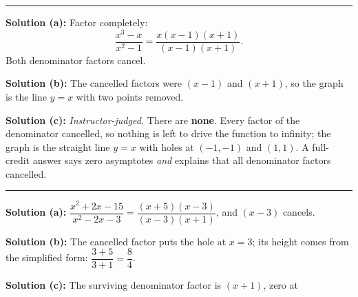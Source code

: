 \documentclass[12pt]{article}
\begin{document}
\vspace{0.25cm}\noindent\rule{\linewidth}{0.2pt}\vspace{0.25cm}


\textbf{Solution (a):} Factor completely:
\[ \frac{x^3-x}{x^2-1} = \frac{x(x-1)(x+1)}{(x-1)(x+1)} . \]
Both denominator factors cancel. 

\textbf{Solution (b):} The cancelled factors were $(x-1)$ and $(x+1)$, so the
graph is the line $y = x$ with two points removed.

\textbf{Solution (c):} \emph{Instructor-judged.} There are \textbf{none}. Every
factor of the denominator cancelled, so nothing is left to drive the function to
infinity; the graph is the straight line $y = x$ with holes at $(-1,-1)$ and
$(1,1)$. A full-credit answer says zero asymptotes \emph{and} explains that all
denominator factors cancelled.

\vspace{0.25cm}\noindent\rule{\linewidth}{0.2pt}\vspace{0.25cm}


\textbf{Solution (a):} $\dfrac{x^2+2x-15}{x^2-2x-3} = \dfrac{(x+5)(x-3)}{(x-3)(x+1)}$,
and $(x-3)$ cancels. 

\textbf{Solution (b):} The cancelled factor puts the hole at $x = 3$; its height
comes from the simplified form: $\dfrac{3+5}{3+1} = \dfrac{8}{4}$. 

\textbf{Solution (c):} The surviving denominator factor is $(x+1)$, zero at
\end{document}
